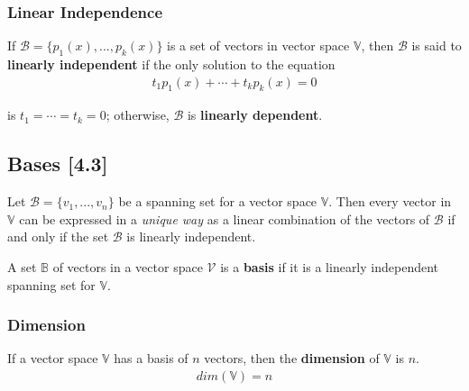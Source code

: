 \documentclass[a4paper,9pt]{extarticle}
\begin{document}
\begin{multicols*}{2}

\subsubsection{Linear Independence}
If $\mathcal{B} = \{p_1(x), ..., p_k(x)\}$ is a set of vectors in vector space $\mathbb{V}$, then $\mathcal{B}$ is said to \textbf{linearly independent} if the only solution to the equation 
\begin{equation} \label{4.2-3}
    \begin{split}
        t_1 p_1(x) + \cdots + t_k p_k(x) = 0
    \end{split}
\end{equation}

is $t_1 = \cdots = t_k = 0$; otherwise, $\mathcal{B}$ is \textbf{linearly dependent}.


\subsection{Bases [4.3]}

Let $\mathcal{B} = \{v_1, ..., v_n\}$ be a spanning set for a vector space $\mathbb{V}$. Then every vector in $\mathbb{V}$ can be expressed in a \textit{unique way} as a linear combination of the vectors of $\mathcal{B}$ if and only if the set $\mathcal{B}$ is linearly independent.

A set $\mathbb{B}$ of vectors in a vector space $\mathcal{V}$ is a \textbf{basis} if it is a linearly independent spanning set for $\mathbb{V}$.


\subsubsection{Dimension}
If a vector space $\mathbb{V}$ has a basis of $n$ vectors, then the \textbf{dimension} of $\mathbb{V}$ is $n$.
\begin{equation} \label{4.3-1}
    \begin{split}
        dim(\mathbb{V}) = n
    \end{split}
\end{equation}



\end{multicols*}
\end{document}
